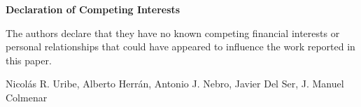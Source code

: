 \documentclass[10pt,a4paper]{article}
\begin{document}
\pagestyle{empty}

{\large\bfseries Declaration of Competing Interests}

\vspace{10pt}

The authors declare that they have no known competing financial interests or
personal relationships that could have appeared to influence the work reported
in this paper.

\vspace{20pt}

\noindent
Nicol\'{a}s R. Uribe,
Alberto Herr\'{a}n,
Antonio J. Nebro,
Javier Del Ser,
J. Manuel Colmenar
\end{document}
